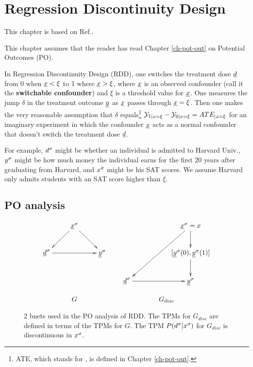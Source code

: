 \chapter{Regression Discontinuity Design}
\label{ch-reg-dis}

This chapter is based on
Ref.\cite{book-mixtape}.

This chapter assumes that the
reader has read Chapter \ref{ch-pot-out}
on Potential Outcomes (PO).

In Regression Discontinuity Design (RDD),
one switches the treatment
dose $\rvd$ from 0 when $\rvx<\xi$ to 1 
where $\rvx>\xi$,  where  $\rvx$ is an
observed confounder (call
it the {\bf switchable confounder})
and $\xi$ is a threshold value
for $\rvx$.
One measures the jump $\delta$
in the treatment outcome $\rvy$
as $\rvx$ passes through
$\rvx=\xi$.
Then one makes the
very reasonable assumption
that $\delta$ equals\footnote{
ATE, which stands for 
,
is defined
in Chapter \ref{ch-pot-out}.}
 ${\cal Y}_{1|x=\xi}-
{\cal Y}_{0|x=\xi}=ATE_{|x=\xi}$
for an imaginary experiment in which
the confounder $\rvx$
acts as a normal confounder
that doesn't switch 
 the treatment dose $\rvd$.

For example,
$d^\sigma$
might be whether
an individual is admitted
to Harvard Univ., $y^\sigma$
might be how much
money
the individual earns for the first 20 years
after graduating from
Harvard, and $x^\sigma$
might be his SAT scores.
We assume Harvard only admits 
students with
an SAT score higher
than $\xi$.



\section{PO analysis}

\begin{figure}[h!]
$$
\begin{array}{ccc}
\xymatrix{
&\rvx^\s\ar[dr]\ar[dl]
\\
\rvd^\s\ar[rr]&&\rvy^\s
}
&&
\xymatrix{
&&\rvx^\s=x\ar[d]\ar[ddll]
\\
&&[\rvy^\s(0), \rvy^\s(1)]\ar[d]
\\
\rvd^\s\ar[rr]&&\rvy^\s
}
\\
\\
G&&G_{disc}
\end{array}
$$
\caption{
2 bnets used in the
PO analysis of RDD. The 
TPMs for $G_{disc}$
are  defined in terms of the TPMs for
$G$. The TPM 
$P(d^\sigma|x^\sigma)$ 
for $G_{disc}$
is discontinuous in $x^\sigma$.}
\label{fig-reg-dis-bnets}
\end{figure}

